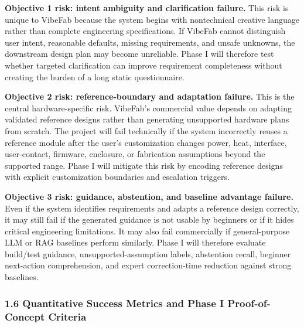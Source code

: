 \noindent
\textbf{Objective 1 risk: intent ambiguity and clarification failure.}
This risk is unique to VibeFab because the system begins with nontechnical creative language rather than complete engineering specifications. If VibeFab cannot distinguish user intent, reasonable defaults, missing requirements, and unsafe unknowns, the downstream design plan may become unreliable. Phase I will therefore test whether targeted clarification can improve requirement completeness without creating the burden of a long static questionnaire.

\noindent
\textbf{Objective 2 risk: reference-boundary and adaptation failure.}
This is the central hardware-specific risk. VibeFab's commercial value depends on adapting validated reference designs rather than generating unsupported hardware plans from scratch. The project will fail technically if the system incorrectly reuses a reference module after the user's customization changes power, heat, interface, user-contact, firmware, enclosure, or fabrication assumptions beyond the supported range. Phase I will mitigate this risk by encoding reference designs with explicit customization boundaries and escalation triggers.

\noindent
\textbf{Objective 3 risk: guidance, abstention, and baseline advantage failure.}
Even if the system identifies requirements and adapts a reference design correctly, it may still fail if the generated guidance is not usable by beginners or if it hides critical engineering limitations. It may also fail commercially if general-purpose LLM or RAG baselines perform similarly. Phase I will therefore evaluate build/test guidance, unsupported-assumption labels, abstention recall, beginner next-action comprehension, and expert correction-time reduction against strong baselines.

\subsubsection*{1.6 Quantitative Success Metrics and Phase I Proof-of-Concept Criteria}


